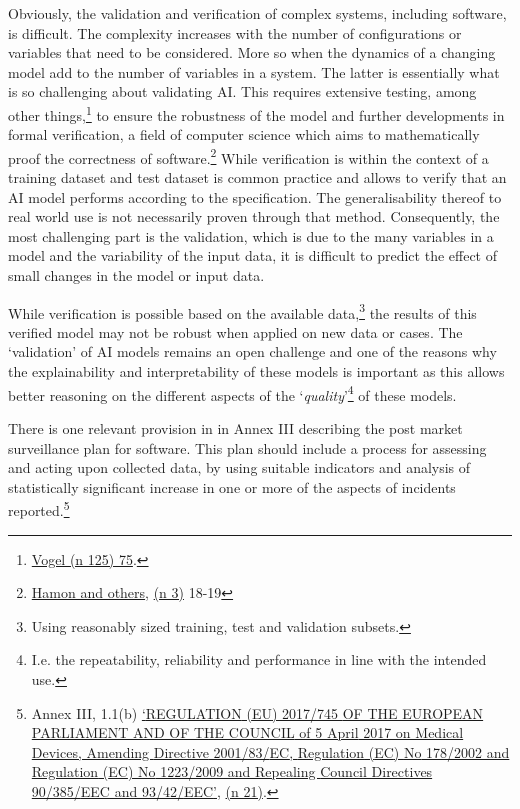 \documentclass[
]{scrartcl}
\begin{document}
Obviously, the validation and verification of complex systems, including software, is difficult. The complexity increases with the number of configurations or variables that need to be considered. More so when the dynamics of a changing model add to the number of variables in a system. The latter is essentially what is so challenging about validating AI. This requires extensive testing, among other things,\footnote{\protect\hyperlink{ref-vogelMedicalDeviceSoftware2011}{Vogel (n 125) 75}.} to ensure the robustness of the model and further developments in formal verification, a field of computer science which aims to mathematically proof the correctness of software.\footnote{\protect\hyperlink{ref-hamonRobustnessExplainabilityArtificial2020}{Hamon and others}, \protect\hyperlink{ref-hamonRobustnessExplainabilityArtificial2020}{(n 3)} 18-19} While verification is within the context of a training dataset and test dataset is common practice and allows to verify that an AI model performs according to the specification. The generalisability thereof to real world use is not necessarily proven through that method. Consequently, the most challenging part is the validation, which is due to the many variables in a model and the variability of the input data, it is difficult to predict the effect of small changes in the model or input data.

While verification is possible based on the available data,\footnote{Using reasonably sized training, test and validation subsets.} the results of this verified model may not be robust when applied on new data or cases. The `validation' of AI models remains an open challenge and one of the reasons why the explainability and interpretability of these models is important as this allows better reasoning on the different aspects of the `\emph{quality}'\footnote{I.e. the repeatability, reliability and performance in line with the intended use.} of these models.

There is one relevant provision in in Annex III describing the post market surveillance plan for software. This plan should include a process for assessing and acting upon collected data, by using suitable indicators and analysis of statistically significant increase in one or more of the aspects of incidents reported.\footnote{Annex III, 1.1(b) \protect\hyperlink{ref-REGULATIONEU2017a}{{`{REGULATION} ({EU}) 2017/745 {OF THE EUROPEAN PARLIAMENT AND OF THE COUNCIL} of 5 {April} 2017 on Medical Devices, Amending {Directive} 2001/83/{EC}, {Regulation} ({EC}) {No} 178/2002 and {Regulation} ({EC}) {No} 1223/2009 and Repealing {Council Directives} 90/385/{EEC} and 93/42/{EEC}'}}, \protect\hyperlink{ref-REGULATIONEU2017a}{(n 21)}.}
\end{document}
